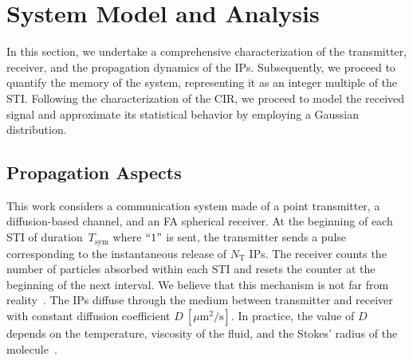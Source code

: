 \documentclass[journal]{IEEEtranTCOM}
\begin{document}
\section{System Model and Analysis}\label{sec:system_model}
In this section, we undertake a comprehensive characterization of the transmitter, receiver, and the propagation dynamics of the IPs. Subsequently, we proceed to quantify the memory of the system, representing it as an integer multiple of the STI. Following the characterization of the CIR, we proceed to model the received signal and approximate its statistical behavior by employing a Gaussian distribution.
\subsection{Propagation Aspects}
This work considers a communication system made of a point transmitter, a diffusion-based channel, and an FA spherical receiver. At the beginning of each STI of duration~$T_{\mathrm{sym}}$ where $``1"$ is sent, the transmitter sends a pulse corresponding to the instantaneous release of $N_{\mathrm{T}}$ IPs. The receiver counts the number of particles absorbed within each STI and resets the counter at the beginning of the next interval. We believe that this mechanism is not far from reality~\cite{upadhyay2019emerging}. The IPs diffuse through the medium between transmitter and receiver with constant diffusion coefficient $D~[\mu \mathrm{m}^2/\mathrm{s}]$. In practice, the value of $D$ depends on the temperature, viscosity of the fluid, and the Stokes’ radius of the molecule~\cite{tyrrell2013diffusion}.
\end{document}

